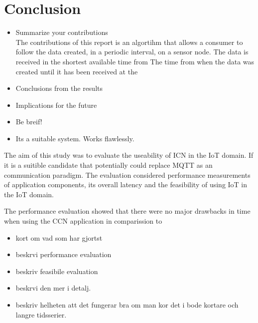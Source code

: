 \section{Conclusion}

\begin{itemize}
\item Summarize your contributions\\
The contributions of this report is an algortihm that allows a consumer to follow the data created, in a periodic interval, on a sensor node. 
The data is received in the shortest available time from 
The time from when the data was created until it has been received at the 

\item Conclusions from the results
\item Implications for the future 
\item Be breif!

\item Its a suitable system. Works flawlessly.
\end{itemize} 

The aim of this study was to evaluate the useability of ICN in the IoT domain. If it is a suitible candidate that potentially could replace MQTT as an communication paradigm.
The evaluation considered performance measurements of application components, its overall latency and the feasibility of using IoT in the IoT domain.

The performance evaluation showed that there were no major drawbacks in time when using the CCN application in comparission to 


\begin{itemize}
\item kort om vad som har gjortst
\item beskrvi performance evaluation
\item beskriv feasibile evaluation
\item beskrvi den mer i detalj.
\item beskriv helheten att det fungerar bra om man kor det i bode kortare och langre tidsserier.
\end{itemize}



